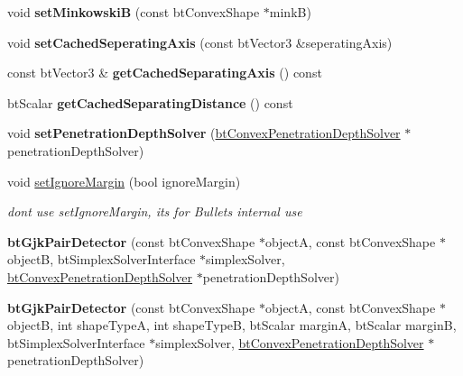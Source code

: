 \begin{DoxyCompactItemize}
void {\bfseries set\+MinkowskiB} (const bt\+Convex\+Shape $\ast$minkB)
\item 
\mbox{\label{classbtGjkPairDetector_ab7fa662834f692ae7ee3c08cc1f23cd0}} 
void {\bfseries set\+Cached\+Seperating\+Axis} (const bt\+Vector3 \&seperating\+Axis)
\item 
\mbox{\label{classbtGjkPairDetector_aa90041d8e75db3d580c93b1b60cfb101}} 
const bt\+Vector3 \& {\bfseries get\+Cached\+Separating\+Axis} () const
\item 
\mbox{\label{classbtGjkPairDetector_a42b0eac142de4c92cb541932533a13ee}} 
bt\+Scalar {\bfseries get\+Cached\+Separating\+Distance} () const
\item 
\mbox{\label{classbtGjkPairDetector_a253d7d36f6ca288e41305682814c8c60}} 
void {\bfseries set\+Penetration\+Depth\+Solver} (\hyperlink{classbtConvexPenetrationDepthSolver}{bt\+Convex\+Penetration\+Depth\+Solver} $\ast$penetration\+Depth\+Solver)
\item 
\mbox{\label{classbtGjkPairDetector_a93e9752920c57c39faca247fc005750e}} 
void \hyperlink{classbtGjkPairDetector_a93e9752920c57c39faca247fc005750e}{set\+Ignore\+Margin} (bool ignore\+Margin)
\begin{DoxyCompactList}\small\item\em don\textquotesingle{}t use set\+Ignore\+Margin, it\textquotesingle{}s for Bullet\textquotesingle{}s internal use \end{DoxyCompactList}\item 
\mbox{\label{classbtGjkPairDetector_a57f8635def7c26f5eebada28c1e6f2e0}} 
{\bfseries bt\+Gjk\+Pair\+Detector} (const bt\+Convex\+Shape $\ast$objectA, const bt\+Convex\+Shape $\ast$objectB, bt\+Simplex\+Solver\+Interface $\ast$simplex\+Solver, \hyperlink{classbtConvexPenetrationDepthSolver}{bt\+Convex\+Penetration\+Depth\+Solver} $\ast$penetration\+Depth\+Solver)
\item 
\mbox{\label{classbtGjkPairDetector_a1de8180060fdf40cda4a00c9c9493c26}} 
{\bfseries bt\+Gjk\+Pair\+Detector} (const bt\+Convex\+Shape $\ast$objectA, const bt\+Convex\+Shape $\ast$objectB, int shape\+TypeA, int shape\+TypeB, bt\+Scalar marginA, bt\+Scalar marginB, bt\+Simplex\+Solver\+Interface $\ast$simplex\+Solver, \hyperlink{classbtConvexPenetrationDepthSolver}{bt\+Convex\+Penetration\+Depth\+Solver} $\ast$penetration\+Depth\+Solver)

\end{DoxyCompactItemize}
